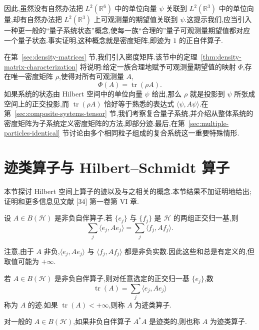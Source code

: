 因此,虽然没有自然办法把 $L^2(\mathbb R^6)$ 中的单位向量 $\psi$ 关联到 $L^2(\mathbb R^3)$ 中的单位向量,却有自然办法把 $L^2(\mathbb R^3)$ 上可观测量的期望值关联到 $\psi$.这提示我们,应当引入一种更一般的“量子系统状态”概念,使每一族“合理的”量子可观测量期望值都对应一个量子状态.事实证明,这种概念就是密度矩阵,即迹为 $1$ 的正自伴算子.

在第~\ref{sec:density-matrices} 节,我们引入密度矩阵.该节中的定理~\ref{thm:density-matrix-characterization} 将说明:给定一族合理地赋予可观测量期望值的映射 $\Phi$,存在唯一密度矩阵 $\rho$,使得对所有可观测量 $A$,
\[
 \Phi(A)=\operatorname{tr}(\rho A).
\]
如果系统的状态由 Hilbert 空间中的单位向量 $\psi$ 给出,那么 $\rho$ 就是投影到 $\psi$ 所张成空间上的正交投影,而 $\operatorname{tr}(\rho A)$ 恰好等于熟悉的表达式 $\langle\psi,A\psi\rangle$.在第~\ref{sec:composite-systems-tensor} 节,我们考察复合量子系统,并介绍从整体系统的密度矩阵为子系统定义密度矩阵的方法,即部分迹.最后,在第~\ref{sec:multiple-particles-identical} 节讨论由多个相同粒子组成的复合系统这一重要特殊情形.

\section{迹类算子与 Hilbert--Schmidt 算子}
\label{sec:trace-class-hilbert-schmidt}

本节探讨 Hilbert 空间上算子的迹以及与之相关的概念.本节结果不加证明地给出;证明和更多信息见文献 [34] 第一卷第 VI 章.

\begin{proposition}[非负算子的迹与正交归一基无关]\label{prop:trace-positive-basis-independent}
设 $A\in B(\mathcal H)$ 是非负自伴算子.若 $\{e_j\}$ 与 $\{f_j\}$ 是 $\mathcal H$ 的两组正交归一基,则
\[
 \sum_j\langle e_j,Ae_j\rangle
 =\sum_j\langle f_j,Af_j\rangle.
\]
\end{proposition}

注意,由于 $A$ 非负,$\langle e_j,Ae_j\rangle$ 与 $\langle f_j,Af_j\rangle$ 都是非负实数.因此这些和总是有定义的,但取值可能为 $+\infty$.

\begin{definition}[迹与迹类算子]\label{def:trace-class}
若 $A\in B(\mathcal H)$ 是非负自伴算子,则对任意选定的正交归一基 $\{e_j\}$,数
\[
 \operatorname{tr}(A)=\sum_j\langle e_j,Ae_j\rangle
\]
称为 $A$ 的迹.如果 $\operatorname{tr}(A)<+\infty$,则称 $A$ 为迹类算子.

对一般的 $A\in B(\mathcal H)$,如果非负自伴算子 $A^*A$ 是迹类的,则也称 $A$ 为迹类算子.
\end{definition}

